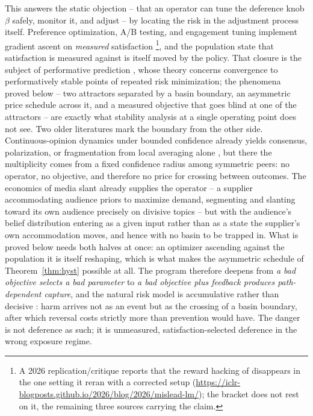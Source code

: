 \documentclass[11pt]{article}
\theoremstyle{definition}
\theoremstyle{remark}
\numberwithin{equation}{section}
\begin{document}
This answers the static objection -- that an operator can tune the deference knob $\beta$ safely, monitor it, and adjust -- by locating the risk in the adjustment process itself. Preference optimization, A/B testing, and engagement tuning implement gradient ascent on \emph{measured} satisfaction \citep{gao2023scaling,sharma2024towards,wen2025language,williams2025targeted}\footnote{A 2026 replication/critique reports that the reward hacking of \citet{wen2025language} disappears in the one setting it reran with a corrected setup (\url{https://iclr-blogposts.github.io/2026/blog/2026/mislead-lm/}); the bracket does not rest on it, the remaining three sources carrying the claim.}, and the population state that satisfaction is measured against is itself moved by the policy. That closure is the subject of performative prediction \citep{perdomo2020performative}, whose theory concerns convergence to performatively stable points of repeated risk minimization; the phenomena proved below -- two attractors separated by a basin boundary, an asymmetric price schedule across it, and a measured objective that goes blind at one of the attractors -- are exactly what stability analysis at a single operating point does not see. Two older literatures mark the boundary from the other side. Continuous-opinion dynamics under bounded confidence already yields consensus, polarization, or fragmentation from local averaging alone \citep{hegselmann2002opinion, deffuant2000mixing}, but there the multiplicity comes from a fixed confidence radius among symmetric peers: no operator, no objective, and therefore no price for crossing between outcomes. The economics of media slant already supplies the operator -- a supplier accommodating audience priors to maximize demand, segmenting and slanting toward its own audience precisely on divisive topics \citep{mullainathan2005market, gentzkow2006media} -- but with the audience's belief distribution entering as a given input rather than as a state the supplier's own accommodation moves, and hence with no basin to be trapped in. What is proved below needs both halves at once: an optimizer ascending against the population it is itself reshaping, which is what makes the asymmetric schedule of Theorem~\ref{thm:hyst} possible at all. The program therefore deepens from \emph{a bad objective selects a bad parameter} to \emph{a bad objective plus feedback produces path-dependent capture}, and the natural risk model is accumulative rather than decisive \citep{kasirzadeh2025two}: harm arrives not as an event but as the crossing of a basin boundary, after which reversal costs strictly more than prevention would have. The danger is not deference as such; it is unmeasured, satisfaction-selected deference in the wrong exposure regime.
\end{document}
